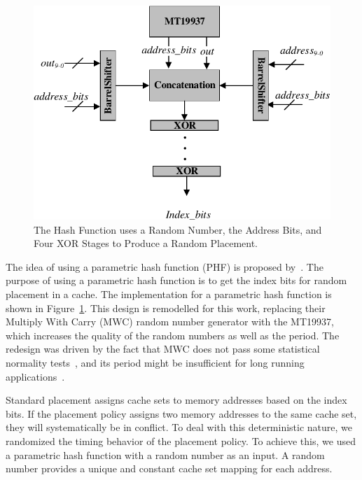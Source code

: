 \begin{figure}[tb]

   \includegraphics[scale=1]{figures/img/hash_function.pdf}
   \caption{The Hash Function uses a Random Number, the Address Bits, and Four XOR Stages to Produce a Random Placement.}
\label{fig:hash_function}
\end{figure}


The idea of using a parametric hash function (PHF) is proposed by~\cite{Kosmidis:2013:CDP:2485288.2485416}. The purpose of using a parametric hash function is to get the index bits for random placement in a cache. The implementation for a parametric hash function is shown in Figure~\ref{fig:hash_function}.
This design is remodelled
for this work, replacing their Multiply With Carry (MWC) random number
generator with the MT19937, which increases the quality of the random
numbers as well as the period.  The redesign was driven by the fact
that MWC does not pass some statistical normality
tests~\cite{bandyopadhyay2015discrete}, and its period might be
insufficient for long running
applications~\cite{Goresky:2003:EMR:945511.945514}.

Standard placement assigns cache sets to memory addresses based on the index bits. If the placement policy assigns two memory
addresses to the same cache set, they will systematically be in conflict. 
To deal with this deterministic nature, we randomized the timing
behavior of the placement policy. To achieve this, we used a parametric hash
function with a random number as an input.  A random number
provides a unique and constant cache set mapping for each address.


